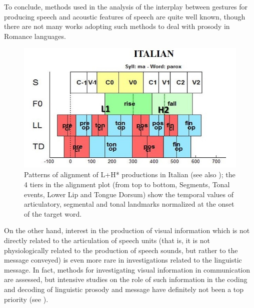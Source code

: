 \documentclass[output=paper]{langsci/langscibook}
\begin{document}
To conclude, methods used in the analysis of the interplay between gestures for producing speech and acoustic features of speech are quite well known, \linebreak though there are not many works adopting such methods to deal with prosody in Romance languages. 


\begin{figure}
\includegraphics[width=\textwidth]{figures/GIL-img5.jpg}
\caption{Patterns of alignment of L+H* productions in Italian (see also \citealt{Stella2014}); the 4 tiers in the alignment plot (from top to bottom, Segments, Tonal events, Lower Lip and Tongue Dorsum) show the temporal values of articulatory, segmental and tonal landmarks normalized at the onset of the target word.}
\label{fig:gil:3}
\end{figure} 

On the other hand, interest in the production of visual information which is not directly related to the articulation of speech units (that is, it is not physiologically related to the production of speech sounds, but rather to the message conveyed) is even more rare in investigations related to the linguistic message. In fact, methods for investigating visual information in communication are assessed, but intensive studies on the role of such information in the coding and decoding of linguistic prosody and message have definitely not been a top priority (see ).
\end{document}
